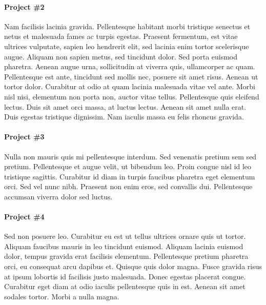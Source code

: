 \documentclass[letterpaper]{article}
\begin{document}
\paragraph{Project \#2}
Nam facilisis lacinia gravida. Pellentesque habitant morbi tristique
senectus et netus et malesuada fames ac turpis egestas. Praesent
fermentum, est vitae ultrices vulputate, sapien leo hendrerit elit,
sed lacinia enim tortor scelerisque augue. Aliquam non sapien metus,
sed tincidunt dolor. Sed porta euismod pharetra. Aenean augue urna,
sollicitudin at viverra quis, ullamcorper ac quam. Pellentesque est
ante, tincidunt sed mollis nec, posuere sit amet risus. Aenean ut
tortor dolor. Curabitur at odio at quam lacinia malesuada vitae vel
ante. Morbi nisl nisi, elementum non porta non, auctor vitae tellus.
Pellentesque quis eleifend lectus. Duis sit amet orci massa, at luctus
lectus. Aenean sit amet nulla erat. Duis egestas tristique dignissim.
Nam iaculis massa eu felis rhoncus gravida.

\paragraph{Project \#3}
Nulla non mauris quis mi pellentesque interdum. Sed venenatis pretium
sem sed pretium. Pellentesque et augue velit, ut bibendum leo. Proin
congue nisl id leo tristique sagittis. Curabitur id diam in turpis
faucibus pharetra eget elementum orci. Sed vel nunc nibh. Praesent non
enim eros, sed convallis dui. Pellentesque accumsan viverra dolor sed
luctus.

\paragraph{Project \#4}
Sed non posuere leo. Curabitur eu est ut tellus ultrices ornare quis
ut tortor. Aliquam faucibus mauris in leo tincidunt euismod. Aliquam
lacinia euismod dolor, tempus gravida erat facilisis elementum.
Pellentesque pretium pharetra orci, eu consequat arcu dapibus et.
Quisque quis dolor magna. Fusce gravida risus at ipsum lobortis id
facilisis justo malesuada. Donec egestas placerat congue. Curabitur
eget diam at odio iaculis pellentesque quis in est. Aenean sit amet
sodales tortor. Morbi a nulla magna.
\end{document}
